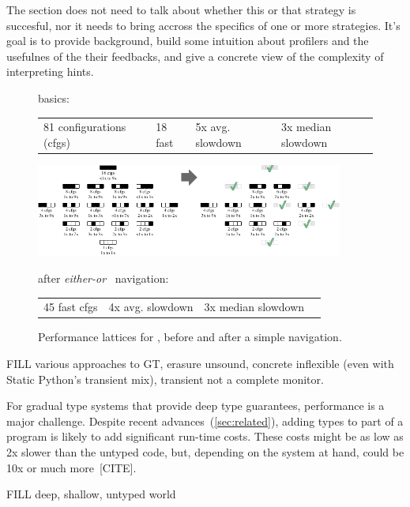 The section does not need to talk about whether this or that strategy is
succesful, nor it needs to bring accross the specifics of one or more
strategies. It's goal is to provide background, build some intuition about
profilers and the usefulnes of the their feedbacks, and give a concrete view of
 the complexity of interpreting hints.


\begin{figure}[htb]

   basics:
  \begin{tabular}{llll}
    81 configurations (cfgs) &
    18 fast &
    5x avg. slowdown &
    3x median slowdown
  \end{tabular}

  \bigskip

  \includegraphics[width=0.9\textwidth]{data/fsm-lattice.pdf}

  after \emph{either-or}~\cite{g-deep-shallow} navigation:
  \begin{tabular}{llll}
    45 fast cfgs &
    4x avg. slowdown &
    3x median slowdown
  \end{tabular}

  \caption{Performance lattices for , before and after a simple navigation.}
  \label{f:fsm-seascape}
\end{figure}

FILL various approaches to GT,
erasure unsound,
concrete inflexible (even with Static Python's transient mix),
transient not a complete monitor.

For gradual type systems that provide deep type guarantees,
performance is a major challenge.
Despite recent advances~(\cref{sec:related}), adding types to part of a program
is likely to add significant run-time costs.
These costs might be as low as 2x slower than the untyped code, but, depending
on the system at hand, could be 10x or much more~[CITE].

FILL deep, shallow, untyped world

